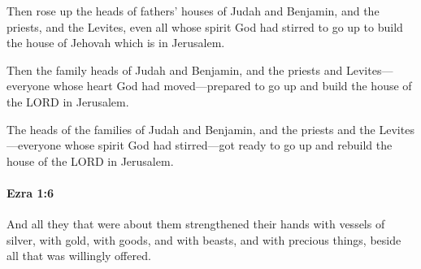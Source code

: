 			\begin{versebox}
					\item[BHS] 
					\item[LXX] 
					\item[ASV] Then rose up the heads of fathers' houses of Judah and Benjamin, and the priests, and the Levites, even all whose spirit God had stirred to go up to build the house of Jehovah which is in Jerusalem.
					\item[NIV] Then the family heads of Judah and Benjamin, and the priests and Levites—everyone whose heart God had moved—prepared to go up and build the house of the LORD in Jerusalem.
					\item[NRSV] The heads of the families of Judah and Benjamin, and the priests and the Levites—everyone whose spirit God had stirred—got ready to go up and rebuild the house of the LORD in Jerusalem.
			\end{versebox}

		\paragraph{Ezra 1:6} %
			\label{EZRA-1-6}

			And all they that were about them strengthened their hands with vessels of silver, with gold, with goods, and with beasts, and with precious things, beside all that was willingly offered.

